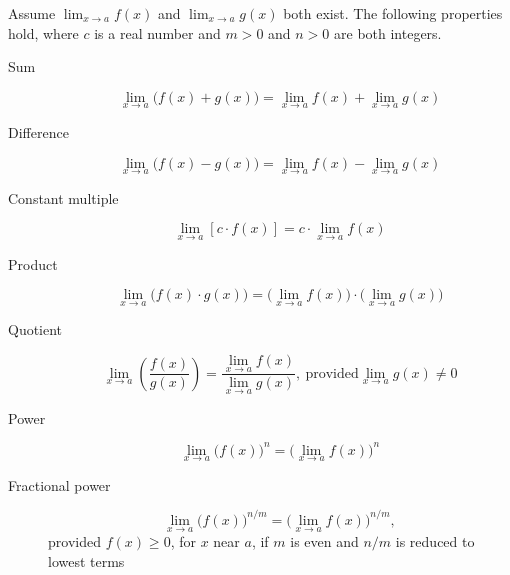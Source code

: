 \documentclass[nooutcomes,handout]{ximera}
\begin{document}
  Assume $\lim_{x \to a} f(x)$ and $\lim_{x \to a} g(x)$ both exist.
  The following properties hold, where $c$ is a real number and $m > 0$ and $n > 0$ are both integers.
  \begin{description}
      \item[Sum]
        \[
          \lim_{x \to a} \bigl(f(x) + g(x)\bigr) = \lim_{x \to a} f(x) + \lim_{x \to a} g(x)
        \]

      \item[Difference]
        \[
          \lim_{x \to a} \bigl(f(x) - g(x)\bigr) = \lim_{x \to a} f(x) - \lim_{x \to a} g(x)
        \]

      \item[Constant multiple]
        \[
          \lim_{x \to a} \left[c \cdot f(x) \right] = c \cdot \lim_{x \to a} f(x)
        \]

      \item[Product]
        \[
          \lim_{x \to a} \bigl(f(x) \cdot g(x)\bigr) = \bigl(\lim_{x \to a} f(x)\bigr) \cdot \bigl(\lim_{x \to a} g(x) \bigr)
        \]

      \item[Quotient]
        \[
          \lim_{x \to a} \left(\frac{f(x)}{g(x)}\right) = \frac{\lim_{x \to a} f(x)}{\lim_{x \to a} g(x)},\ \text{provided} \lim_{x \to a} g(x) \ne 0
        \]   

      \item[ Power]
        \[
          \lim_{x \to a} \bigl(f(x)\bigr)^n = \bigl(\lim_{x \to a} f(x)\bigr)^n
        \]

      \item[Fractional power]
        \[
          \lim_{x \to a} \bigl(f(x)\bigr)^{n/m} = \bigl(\lim_{x \to a} f(x)\bigr)^{n/m},
        \]
        provided $f(x) \ge 0$, for $x$ near $a$, if $m$ is even and $n/m$ is reduced to lowest terms
    \end{description}
\end{document}
